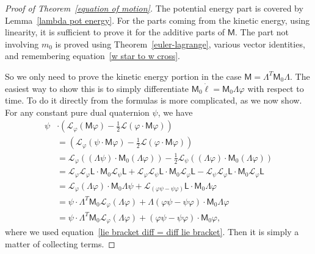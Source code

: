 \documentclass[reqno,12pt]{amsart}
\newcommand{\liederiv}{\mathcal L}
\begin{document}
\begin{proof}[Proof of Theorem~\ref{equation of motion}] The potential energy part is covered by Lemma~\ref{lambda pot energy}.  For the parts coming from the kinetic energy, using linearity, it is sufficient to prove it for the additive parts of $\mathsf M$.  The part not involving $m_0$ is proved using Theorem~\ref{euler-lagrange}, various vector identities, and remembering equation~\eqref{w star to w cross}.

So we only need to prove the kinetic energy portion in the case $\mathsf M = \mathsf \Lambda^T \mathsf M_0 \mathsf \Lambda$.  The easiest way to show this is to simply differentiate $\mathsf M_0 \dot \ell = \mathsf M_0 \mathsf\Lambda\varphi$ with respect to time.  To do it directly from the formulas is more complicated, as we now show.  For any constant pure dual quaternion $\psi$, we have
\begin{equation}
\begin{aligned}
\psi &\cdot (\liederiv_\varphi(\mathsf M \varphi) - \tfrac12 \liederiv(\varphi \cdot \mathsf M \varphi)) \\
&= (\liederiv_\varphi(\psi \cdot \mathsf M \varphi) - \tfrac12 \liederiv(\varphi \cdot \mathsf M \varphi)) \\
&= \liederiv_\varphi ((\mathsf \Lambda \psi) \cdot \mathsf M_0 (\mathsf \Lambda \varphi))
- \tfrac12 \liederiv_\psi  ((\mathsf \Lambda \varphi) \cdot \mathsf M_0(\mathsf \Lambda \varphi)) \\
&= \liederiv_\varphi \liederiv_\varphi \mathsf L \cdot \mathsf M_0 \liederiv_\psi \mathsf L
+ \liederiv_\varphi \liederiv_\psi \mathsf L \cdot \mathsf M_0\liederiv_\varphi \mathsf L - \liederiv_\psi \liederiv_\varphi \mathsf L \cdot \mathsf M_0\liederiv_\varphi \mathsf L \\
&= \liederiv_\varphi (\mathsf\Lambda \varphi) \cdot \mathsf M_0\mathsf\Lambda \psi
+ \liederiv_{(\varphi \psi - \psi \varphi)} \mathsf L \cdot \mathsf M_0\mathsf\Lambda \varphi \\
&= \psi \cdot \mathsf\Lambda^T \mathsf M_0 \liederiv_\varphi (\mathsf \Lambda \varphi)
+ \mathsf \Lambda (\varphi\psi - \psi\varphi) \cdot \mathsf M_0 \mathsf \Lambda \varphi
\\
&= \psi \cdot \mathsf\Lambda^T \mathsf M_0\liederiv_\varphi (\mathsf \Lambda \varphi)
+ (\varphi\psi - \psi\varphi) \cdot \mathsf M_0 \varphi,
\end{aligned}
\end{equation}
where we used equation~\eqref{lie bracket diff = diff lie bracket}.  Then it is simply a matter of collecting terms.
\end{proof}
\end{document}
